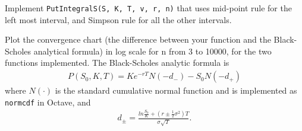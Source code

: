 \documentclass[12pt,a4paper,hidelinks,fleqn]{article}            %
\begin{document}
Implement \verb=PutIntegralS(S, K, T, v, r, n)= that uses mid-point rule for the left most interval, and Simpson rule for all the other intervals.

Plot the convergence chart (the difference between your function and the Black-Scholes analytical formula) in log scale for n from 3 to 10000, for the two functions implemented.
The Black-Scholes analytic formula is
\begin{align*}
P(S_0, K, T) = Ke^{-rT} N(-d_-) - S_0 N(-d_+)
\end{align*}
where $N(\cdot)$ is the standard cumulative normal function and is implemented as \verb=normcdf= in Octave, and
\begin{align*}
d_{\pm} = \frac{ln\frac{S_0}{K} + (r \pm \frac{1}{2}\sigma^2)T}{\sigma\sqrt{T}}.
\end{align*}
\end{document}
